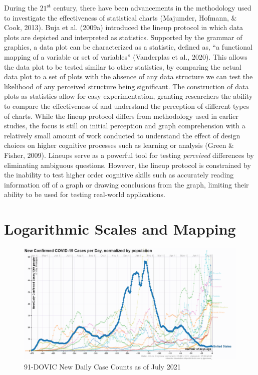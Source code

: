 \documentclass[print]{nuthesis}
\begin{document}
During the \(\text{21}^{\text{st}}\) century, there have been advancements in the methodology used to investigate the effectiveness of statistical charts (Majumder, Hofmann, \& Cook, 2013).
Buja et al. (2009a) introduced the lineup protocol in which data plots are depicted and interpreted as statistics.
Supported by the grammar of graphics, a data plot can be characterized as a statistic, defined as, ``a functional mapping of a variable or set of variables'' (Vanderplas et al., 2020).
This allows the data plot to be tested similar to other statistics, by comparing the actual data plot to a set of plots with the absence of any data structure we can test the likelihood of any perceived structure being significant.
The construction of data plots as statistics allow for easy experimentation, granting researchers the ability to compare the effectiveness of and understand the perception of different types of charts.
While the lineup protocol differs from methodology used in earlier studies, the focus is still on initial perception and graph comprehension with a relatively small amount of work conducted to understand the effect of design choices on higher cognitive processes such as learning or analysis (Green \& Fisher, 2009).
Lineups serve as a powerful tool for testing \emph{perceived} differences by eliminating ambiguous questions.
However, the lineup protocol is constrained by the inability to test higher order cognitive skills such as accurately reading information off of a graph or drawing conclusions from the graph, limiting their ability to be used for testing real-world applications.

\hypertarget{logarithmic-scales-and-mapping}{%
\section{Logarithmic Scales and Mapping}\label{logarithmic-scales-and-mapping}}

\begin{figure}[tbp]

{\centering \includegraphics[width=0.9\linewidth,]{images/91dovic-cases-july2021} 

}

\caption{91-DOVIC New Daily Case Counts as of July 2021}\label{fig:91divoc-cases-july2021}
\end{figure}
\end{document}
